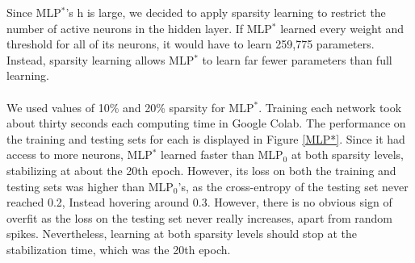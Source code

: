 \documentclass{homework}
\begin{document}
Since MLP$^*$'s h is large, we decided to apply sparsity learning to restrict the number of active neurons in the hidden layer. If MLP$^*$ learned every weight and threshold for all of its neurons, it would have to learn 259,775 parameters. Instead, sparsity learning allows MLP$^*$ to learn far fewer parameters than full learning. \\\\
We used values of 10\% and 20\% sparsity for MLP$^*$. Training each network took about thirty seconds each computing time in Google Colab. The performance on the training and testing sets for each is displayed in Figure \ref{MLP*}. Since it had access to more neurons, MLP$^*$ learned faster than MLP$_0$ at both sparsity levels, stabilizing at about the 20th epoch. However, its loss on both the training and testing sets was higher than MLP$_0$'s, as the cross-entropy of the testing set never reached 0.2, Instead hovering around 0.3. However, there is no obvious sign of overfit as the loss on the testing set never really increases, apart from random spikes. Nevertheless, learning at both sparsity levels should stop at the stabilization time, which was the 20th epoch.
\end{document}
